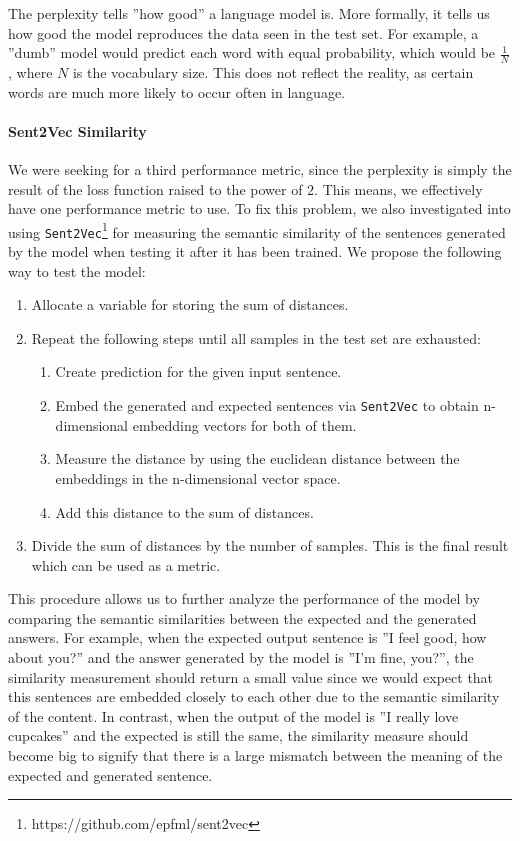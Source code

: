 The perplexity tells ''how good'' a language model is. More formally, it tells us how good the model reproduces the data seen in the test set. For example, a ''dumb'' model would predict each word with equal probability, which would be $\frac{1}{N}$, where $N$ is the vocabulary size. This does not reflect the reality, as certain words are much more likely to occur often in language.

\paragraph{Sent2Vec Similarity} We were seeking for a third performance metric, since the perplexity is simply the result of the loss function raised to the power of $2$. This means, we effectively have one performance metric to use. To fix this problem, we also investigated into using \texttt{Sent2Vec}\footnote{https://github.com/epfml/sent2vec} \cite{Pgj:2017} for measuring the semantic similarity of the sentences generated by the model when testing it after it has been trained. We propose the following way to test the model:

\begin{enumerate}[noitemsep]
	\item Allocate a variable for storing the sum of distances.
	\item Repeat the following steps until all samples in the test set are exhausted:
	\begin{enumerate}[noitemsep]
		\item Create prediction for the given input sentence.
		\item Embed the generated and expected sentences via \texttt{Sent2Vec} to obtain n-dimensional embedding vectors for both of them.
		\item Measure the distance by using the euclidean distance between the embeddings in the n-dimensional vector space.
		\item Add this distance to the sum of distances.
	\end{enumerate}
	\item Divide the sum of distances by the number of samples. This is the final result which can be used as a metric.
\end{enumerate}

This procedure allows us to further analyze the performance of the model by comparing the semantic similarities between the expected and the generated answers. For example, when the expected output sentence is ''I feel good, how about you?'' and the answer generated by the model is ''I'm fine, you?'', the similarity measurement should return a small value since we would expect that this sentences are embedded closely to each other due to the semantic similarity of the content. In contrast, when the output of the model is ''I really love cupcakes'' and the expected is still the same, the similarity measure should become big to signify that there is a large mismatch between the meaning of the expected and generated sentence.

